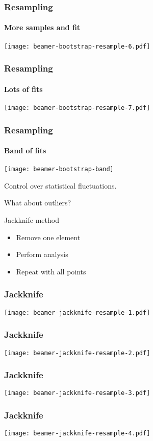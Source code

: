 \documentclass[english, fleqn]{beamer}
\begin{document}
\begin{frame}
    \frametitle{Resampling}
    \framesubtitle{More samples and fit}
    \centering
    \texttt{[image: beamer-bootstrap-resample-6.pdf]}
\end{frame}

\begin{frame}
    \frametitle{Resampling}
    \framesubtitle{Lots of fits}
    \centering
    \texttt{[image: beamer-bootstrap-resample-7.pdf]}
\end{frame}

\begin{frame}
    \frametitle{Resampling}
    \framesubtitle{Band of fits}
    \centering
    \texttt{[image: beamer-bootstrap-band]}
\end{frame}

\begin{frame}
    Control over statistical fluctuations.

    \pause

    \alert{What about outliers?}

    \pause

    \begin{block}{Jackknife method}
        \begin{itemize}
            \item Remove one element
            \item Perform analysis
            \item Repeat with all points
        \end{itemize}
    \end{block}
\end{frame}

\begin{frame}
    \frametitle{Jackknife}
    \centering
    \texttt{[image: beamer-jackknife-resample-1.pdf]}
\end{frame}

\begin{frame}
    \frametitle{Jackknife}
    \centering
    \texttt{[image: beamer-jackknife-resample-2.pdf]}
\end{frame}

\begin{frame}
    \frametitle{Jackknife}
    \centering
    \texttt{[image: beamer-jackknife-resample-3.pdf]}
\end{frame}

\begin{frame}
    \frametitle{Jackknife}
    \centering
    \texttt{[image: beamer-jackknife-resample-4.pdf]}
\end{frame}
\end{document}
